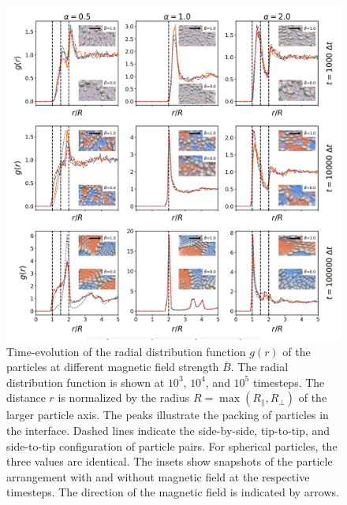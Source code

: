 \begin{figure}
\centering
\includegraphics[width=\textwidth]{figures/results/paper1/rdf_compare_time.png}
\caption{Time-evolution of the radial distribution function $g(r)$ of the particles at different magnetic 
        field strength $\bar{B}$. The radial distribution function is shown at $10^3$, $10^4$, and $10^5$ timesteps. 
        The distance $r$ is normalized by the radius $R=\max(R_\parallel,R_\perp)$ of the larger particle axis. The peaks 
        illustrate the packing of particles in the interface. Dashed lines indicate the side-by-side, tip-to-tip, 
        and side-to-tip configuration of particle pairs. For spherical particles, the three values are identical. 
        The insets show snapshots of the particle arrangement with and without magnetic field at the respective timesteps. 
        The direction of the magnetic field is indicated by arrows.}
\label{fig:rdf}
\end{figure}

